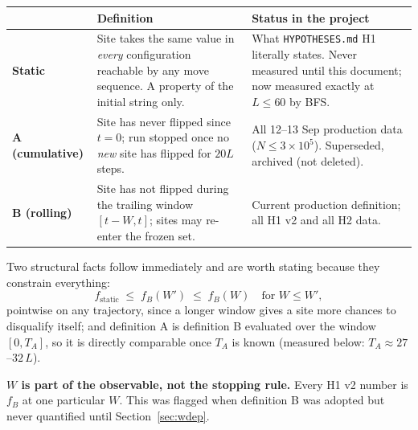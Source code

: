 \documentclass[11pt,a4paper]{article}
\begin{document}
\begin{center}\small
\begin{tabular}{@{}lp{6.0cm}p{6.2cm}@{}}
\toprule
& \textbf{Definition} & \textbf{Status in the project} \\
\midrule
\textbf{Static} &
Site takes the same value in \emph{every} configuration reachable by any
move sequence. A property of the initial string only. &
What \texttt{HYPOTHESES.md} H1 literally states. Never measured until this
document; now measured exactly at $L\le60$ by BFS. \\
\addlinespace
\textbf{A (cumulative)} &
Site has never flipped since $t=0$; run stopped once no \emph{new} site has
flipped for $20L$ steps. &
All 12--13 Sep production data ($N\le3\times10^5$). Superseded, archived
(not deleted). \\
\addlinespace
\textbf{B (rolling)} &
Site has not flipped during the trailing window $[t-W,t]$; sites may
re-enter the frozen set. &
Current production definition; all H1 v2 and all H2 data. \\
\bottomrule
\end{tabular}
\end{center}

Two structural facts follow immediately and are worth stating because they
constrain everything:
\begin{equation}
f_{\text{static}} \;\le\; f_B(W') \;\le\; f_B(W)
\quad\text{for } W\le W' ,
\end{equation}
pointwise on any trajectory, since a longer window gives a site more chances
to disqualify itself; and definition A is definition B evaluated over the
window $[0,T_A]$, so it is directly comparable once $T_A$ is known
(measured below: $T_A\approx27$--$32\,L$).

\textbf{$W$ is part of the observable, not the stopping rule.} Every H1 v2
number is $f_B$ at one particular $W$. This was flagged when definition B
was adopted but never quantified until Section~\ref{sec:wdep}.
\end{document}
